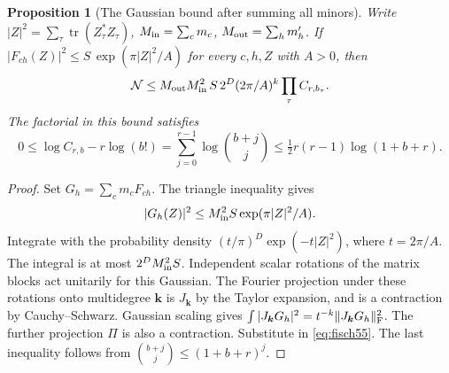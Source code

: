 \documentclass[a4paper,11pt]{article}
\newtheorem{proposition}{Proposition}[section]
\theoremstyle{definition}
\theoremstyle{remark}
\numberwithin{equation}{section}
\begin{document}
\begin{proposition}[The Gaussian bound after summing all minors]\label{prop:gauss55}
Write \(|Z|^2=\sum_\tau\operatorname{tr}(Z_\tau^*Z_\tau)\),
\(M_{\rm in}=\sum_c m_c\), \(M_{\rm out}=\sum_hm'_h\).
If \(|F_{ch}(Z)|^2\le S\,\exp(\pi |Z|^2/A)\) for every \(c,h,Z\)
with \(A>0\), then
\begin{equation}
    \mathcal N\le M_{\rm out}M_{\rm in}^2\, S\,
            2^D(2\pi/A)^k\prod_\tau C_{r,b_\tau}.       \label{eq:gauss55}
\end{equation}
The factorial in this bound satisfies
\[
 0\le\log C_{r,b}-r\log(b!)
      =\sum_{j=0}^{r-1}\log\binom{b+j}{j}
      \le\tfrac12r(r-1)\log(1+b+r).
\]
\end{proposition}
\begin{proof}
Set \(G_h=\sum_c m_c F_{ch}\). The triangle inequality gives
\[
              |G_h(Z)|^2\le M_{\rm in}^2S\exp(\pi|Z|^2/A).
\]
Integrate with the probability
density \((t/\pi)^D\exp(-t|Z|^2)\), where \(t=2\pi/A\).
The integral is at most \(2^D M_{\rm in}^2S\). Independent scalar
rotations of the matrix blocks act unitarily for this Gaussian. The
Fourier projection under these rotations onto multidegree
\(\boldsymbol k\) is \(J_{\boldsymbol k}\) by the Taylor expansion,
and is a contraction by Cauchy--Schwarz. Gaussian scaling gives
\(\int|J_{\boldsymbol k}G_h|^2=t^{-k}\|J_{\boldsymbol k}G_h\|_{\rm F}^2\).
The further projection \(\Pi\) is also a contraction. Substitute in
\eqref{eq:fisch55}. The last inequality follows from
\(\binom{b+j}{j}\le(1+b+r)^j\).
\end{proof}
\end{document}
